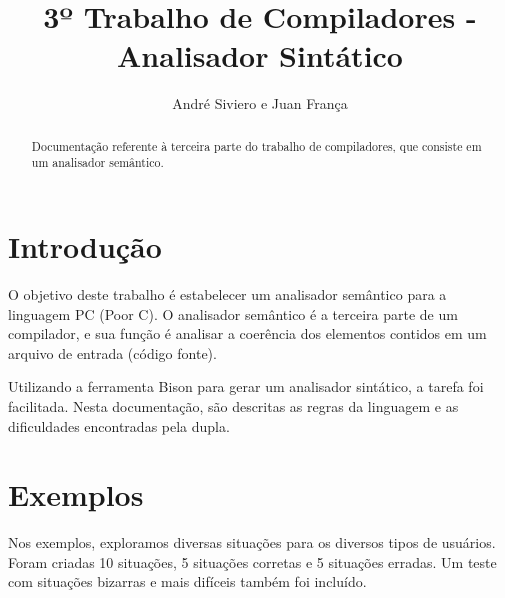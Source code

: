 \documentclass[a4paper,10pt]{article}
\title{3º Trabalho de Compiladores - Analisador Sintático}
\author{André Siviero e Juan França}
\begin{document}
\maketitle

\begin{abstract}
Documentação referente à terceira parte do trabalho de compiladores, que consiste em um analisador semântico.
\end{abstract}

\section{Introdução}
O objetivo deste trabalho é estabelecer um analisador semântico para a linguagem PC (Poor C). O analisador semântico é a terceira parte de um compilador,
e sua função é analisar a coerência dos elementos contidos em um arquivo de entrada (código fonte). 

Utilizando a ferramenta Bison para gerar um analisador sintático, a tarefa foi facilitada. Nesta documentação, são descritas as regras da linguagem e as dificuldades encontradas pela dupla.
\section{}



\section{Exemplos}
Nos exemplos, exploramos diversas situações para os diversos tipos de usuários. Foram criadas 10 situações, 5 situações corretas e 5 
situações erradas. Um teste com situações bizarras e mais difíceis também foi incluído.
\end{document}
